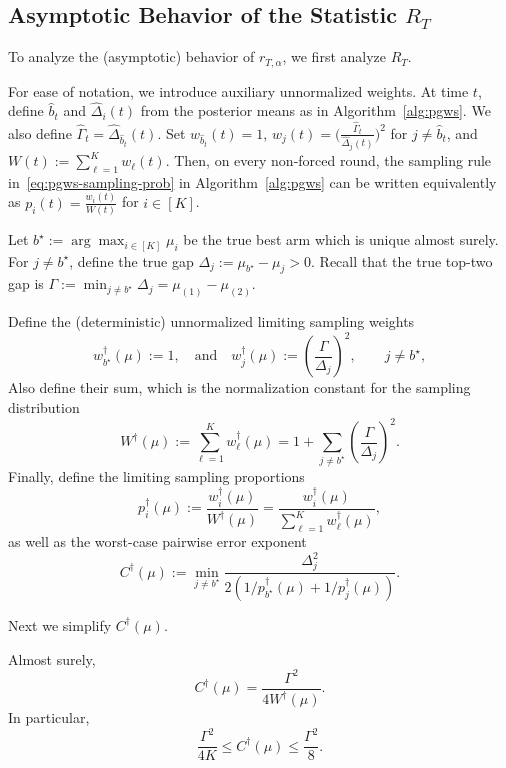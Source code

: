 \documentclass[10pt]{article}
\theoremstyle{plain}
\begin{document}
\subsection{Asymptotic Behavior of the Statistic $R_T$}

To analyze the (asymptotic) behavior of $r_{T,\alpha}$, we first analyze $R_T$.


For ease of notation, we introduce auxiliary unnormalized weights.  At time \(t\), define \(\widehat b_t\) and \(\widehat\Delta_i(t)\) from the
posterior means as in Algorithm~\ref{alg:pgws}.  We also  define $\widehat{\Gamma}_t = \widehat\Delta_{\widehat b_t}(t)$. Set  $w_{\widehat b_t}(t)=1$, $w_{j}(t)=\big(\frac{\widehat{\Gamma}_t}{\widehat\Delta_j(t)}\big)^2$ for $j \neq \widehat b_t$,
and $W(t):=\sum_{\ell=1}^K w_\ell(t)$. Then, on every non-forced round, the sampling rule in~\eqref{eq:pgws-sampling-prob} in
Algorithm~\ref{alg:pgws} can be written equivalently as $p_i(t)=\frac{w_i(t)}{W(t)}$ for $i\in[K]$.


Let
$b^\star:=\arg\max_{i\in[K]}\mu_i$
be the true best arm which is  unique almost surely.
For $j\neq b^\star$, define the true gap
$\Delta_j:=\mu_{b^\star}-\mu_j>0$.
Recall  that the true top-two gap is
$\Gamma:=\min_{j\neq b^\star}\Delta_j
=
\mu_{(1)}-\mu_{(2)}$.

Define the (deterministic) unnormalized limiting sampling weights
\[
w_{b^\star}^\dagger(\mu):=1,
\quad\mbox{and}\quad
w_j^\dagger(\mu)
:=
\left(
\frac{\Gamma}{\Delta_j}
\right)^2,
\qquad j\neq b^\star,
\]
Also define their sum, which is the normalization constant for the sampling distribution
\begin{equation}
W^\dagger(\mu)
:=
\sum_{\ell=1}^K w_\ell^\dagger(\mu)
=
1+\sum_{j\neq b^\star}
\left(
\frac{\Gamma}{\Delta_j}
\right)^2. \label{eqn:W_dagger}
\end{equation}
Finally, define the limiting sampling proportions
\[
p_i^\dagger(\mu)
:= \frac{w_i^\dagger(\mu)}
{W^\dagger(\mu)} =
\frac{w_i^\dagger(\mu)}
{\sum_{\ell=1}^K w_\ell^\dagger(\mu)},
\]
as well as the worst-case pairwise error exponent
\[
C^\dagger(\mu)
:=
\min_{j\neq b^\star}
\frac{
\Delta_j^2
}{
2\left(
1/p_{b^\star}^\dagger(\mu)+1/p_j^\dagger(\mu)
\right)
}.
\]



\noindent Next we simplify $C^\dagger(\mu)$.

\begin{lemma}\label{lem:Cdagger-explicit}
Almost surely, $$C^\dagger(\mu)
=
\frac{\Gamma^2}{4W^\dagger(\mu)}.$$
In particular,
$$\frac{\Gamma^2}{4K}
\le
C^\dagger(\mu)
\le
\frac{\Gamma^2}{8}.$$
\end{lemma}
\end{document}
